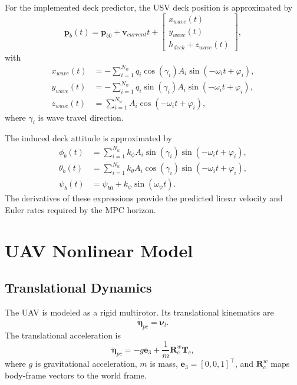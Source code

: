 \documentclass[12pt,a4paper]{article}
\begin{document}
For the implemented deck predictor, the USV deck position is approximated by
\begin{equation}
\bm{p}_b(t)=
\bm{p}_{b0}+\bm{v}_{current}t+
\begin{bmatrix}
x_{wave}(t)\\
y_{wave}(t)\\
h_{deck}+z_{wave}(t)
\end{bmatrix},
\end{equation}
with
\begin{align}
x_{wave}(t)&=-\sum_{i=1}^{N_w}q_i\cos(\gamma_i)A_i\sin(-\omega_i t+\varphi_i),\\
y_{wave}(t)&=-\sum_{i=1}^{N_w}q_i\sin(\gamma_i)A_i\sin(-\omega_i t+\varphi_i),\\
z_{wave}(t)&=\sum_{i=1}^{N_w}A_i\cos(-\omega_i t+\varphi_i),
\end{align}
where $\gamma_i$ is wave travel direction.

The induced deck attitude is approximated by
\begin{align}
\phi_b(t) &= \sum_{i=1}^{N_w} k_{\phi} A_i \sin(\gamma_i)\sin(-\omega_i t+\varphi_i),\\
\theta_b(t) &= \sum_{i=1}^{N_w} k_{\theta} A_i \cos(\gamma_i)\sin(-\omega_i t+\varphi_i),\\
\psi_b(t) &= \psi_{b0}+k_{\psi}\sin(\omega_{\psi}t).
\end{align}
The derivatives of these expressions provide the predicted linear velocity and Euler rates required by the MPC horizon.

\section{UAV Nonlinear Model}

\subsection{Translational Dynamics}

The UAV is modeled as a rigid multirotor. Its translational kinematics are
\begin{equation}
\dot{\bm{\eta}}_{pc}=\bm{\nu}_l.
\end{equation}
The translational acceleration is
\begin{equation}
\ddot{\bm{\eta}}_{pc}
=
-g\bm{e}_3+
\frac{1}{m}\bm{R}^{w}_{c}\bm{T}_c,
\end{equation}
where $g$ is gravitational acceleration, $m$ is mass, $\bm{e}_3=[0,0,1]^{\top}$, and $\bm{R}^{w}_{c}$ maps body-frame vectors to the world frame.
\end{document}
